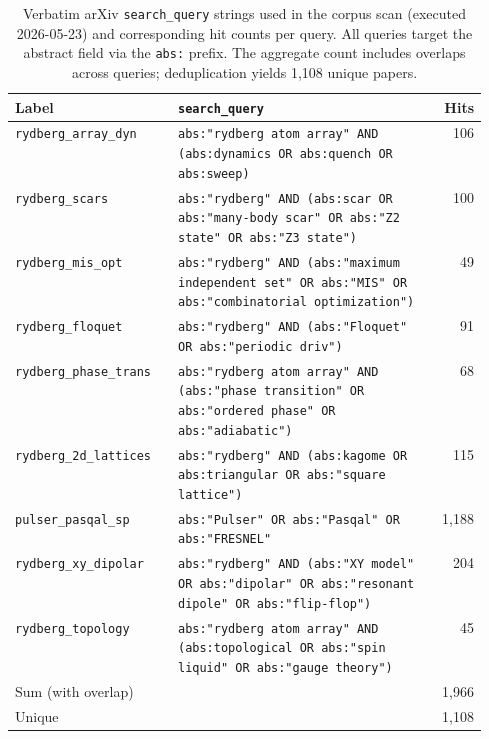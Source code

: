 \documentclass[aps,pra,reprint,amssymb,superscriptaddress,nofootinbib,floatfix]{revtex4-2}
\begin{document}
\begin{table}[t]
  \centering
  \caption{Verbatim arXiv \texttt{search\_query} strings used in the corpus scan (executed 2026-05-23) and corresponding hit counts per query. All queries target the abstract field via the \texttt{abs:} prefix. The aggregate count includes overlaps across queries; deduplication yields 1{,}108 unique papers.}
  \small
  \begin{tabular}{lp{0.55\linewidth}r}
    \toprule
    Label & \texttt{search\_query} & Hits \\
    \midrule
    \texttt{rydberg\_array\_dyn} &
      \texttt{abs:"rydberg atom array" AND (abs:dynamics OR abs:quench OR abs:sweep)} &
      106 \\[2pt]

    \texttt{rydberg\_scars} &
      \texttt{abs:"rydberg" AND (abs:scar OR abs:"many-body scar" OR abs:"Z2 state" OR abs:"Z3 state")} &
      100 \\[2pt]

    \texttt{rydberg\_mis\_opt} &
      \texttt{abs:"rydberg" AND (abs:"maximum independent set" OR abs:"MIS" OR abs:"combinatorial optimization")} &
      49 \\[2pt]

    \texttt{rydberg\_floquet} &
      \texttt{abs:"rydberg" AND (abs:"Floquet" OR abs:"periodic driv")} &
      91 \\[2pt]

    \texttt{rydberg\_phase\_trans} &
      \texttt{abs:"rydberg atom array" AND (abs:"phase transition" OR abs:"ordered phase" OR abs:"adiabatic")} &
      68 \\[2pt]

    \texttt{rydberg\_2d\_lattices} &
      \texttt{abs:"rydberg" AND (abs:kagome OR abs:triangular OR abs:"square lattice")} &
      115 \\[2pt]

    \texttt{pulser\_pasqal\_sp} &
      \texttt{abs:"Pulser" OR abs:"Pasqal" OR abs:"FRESNEL"} &
      1{,}188 \\[2pt]

    \texttt{rydberg\_xy\_dipolar} &
      \texttt{abs:"rydberg" AND (abs:"XY model" OR abs:"dipolar" OR abs:"resonant dipole" OR abs:"flip-flop")} &
      204 \\[2pt]

    \texttt{rydberg\_topology} &
      \texttt{abs:"rydberg atom array" AND (abs:topological OR abs:"spin liquid" OR abs:"gauge theory")} &
      45 \\
    \midrule
    Sum (with overlap)         & & 1{,}966 \\
    Unique & & 1{,}108 \\
    \bottomrule
  \end{tabular}
\end{table}
\end{document}
